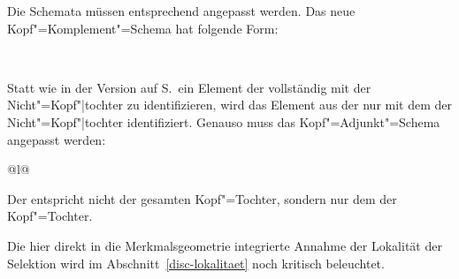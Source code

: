 \noindent
Die Schemata müssen entsprechend angepasst werden. Das neue Kopf"=Komplement"=Schema
hat folgende Form:
\begin{schema}
\label{schema-head-arg}
 \impl\\
\end{schema}
Statt wie in der Version auf S.\,\pageref{schema-Kopf-Komplementschema-prel2} ein Element
der \compsl vollständig mit der Nicht"=Kopf"|tochter zu identifizieren, wird
das Element aus der \compsl nur mit dem \synsemw der Nicht"=Kopf"|tochter identifiziert.
Genauso muss das Kopf"=Adjunkt"=Schema angepasst werden:
\begin{schema}
\label{ha-schema-final}
\begin{tabular}[t]{@{}l@{}}
 \impl\\
\end{tabular}
\end{schema}
Der \modw entspricht nicht der gesamten Kopf"=Tochter, sondern nur dem \synsemw der Kopf"=Tochter.

Die hier direkt in die Merkmalsgeometrie integrierte Annahme der Lokalität der Selektion
wird im Abschnitt~\ref{disc-lokalitaet} noch kritisch beleuchtet.


